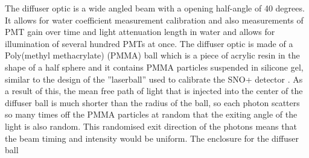 The diffuser optic is a wide angled beam with a opening half-angle of 40 degrees. It allows for water coefficient measurement calibration and also measurements of PMT gain over time and light attenuation length in water and allows for illumination of several hundred PMTs at once. The diffuser optic is made of a Poly(methyl methacrylate) (PMMA) ball which is a piece of acrylic resin in the shape of a half sphere and it contains PMMA particles suspended in silicone gel, similar to the design of the ''laserball'' used to calibrate the SNO+ detector \cite{Moffat_2005}. As a result of this, the mean free path of light that is injected into the center of the diffuser ball is much shorter than the radius of the ball, so each photon scatters so many times off the PMMA particles at random that the exiting angle of the light is also random. This randomised exit direction of the photons means that the beam timing and intensity would be uniform.  
\newline
The enclosure for the diffuser ball 